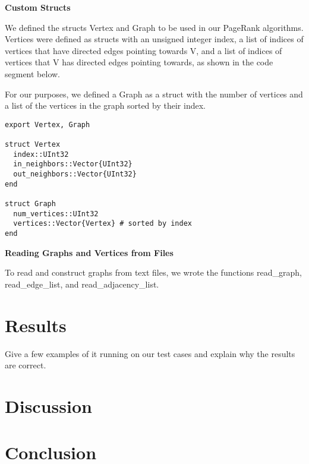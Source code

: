 \documentclass[12pt, titlepage, twoside]{amsart}
\theoremstyle{remark}
\begin{document}
\textbf{Custom Structs}

We defined the structs Vertex and Graph to be used in our PageRank algorithms. Vertices were defined as structs with an unsigned integer index, a list of indices of vertices that have directed edges pointing towards V, and a list of indices of vertices that V has directed edges pointing towards, as shown in the code segment below. 

For our purposes, we defined a Graph as a struct with the number of vertices and a list of the vertices in the graph sorted by their index.

\begin{lstlisting}
export Vertex, Graph

struct Vertex
  index::UInt32
  in_neighbors::Vector{UInt32}
  out_neighbors::Vector{UInt32}
end

struct Graph
  num_vertices::UInt32
  vertices::Vector{Vertex} # sorted by index
end
\end{lstlisting}


\textbf{Reading Graphs and Vertices from Files}

To read and construct graphs from text files, we wrote the functions read\_graph, read\_edge\_list, and read\_adjacency\_list.  
\section{Results}

Give a few examples of it running on our test cases and explain why the results are correct.

\section{Discussion}

\lipsum[1]

\section{Conclusion}

\lipsum[1]
\end{document}
